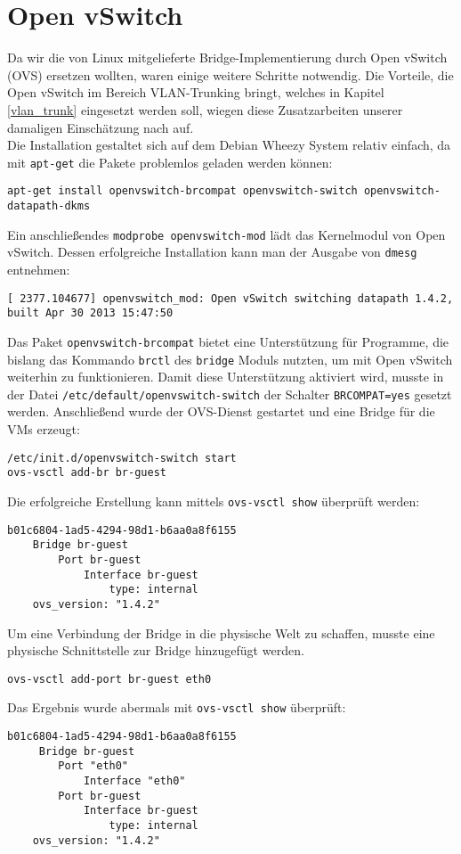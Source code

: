 \chapter{Open vSwitch}
\label{chap:ovs}
Da wir die von Linux mitgelieferte Bridge-Implementierung durch Open vSwitch (OVS) ersetzen wollten, waren einige weitere Schritte notwendig. Die Vorteile, die Open vSwitch im Bereich VLAN-Trunking bringt, welches in Kapitel \ref{vlan_trunk} eingesetzt werden soll, wiegen diese Zusatzarbeiten unserer damaligen Einschätzung nach auf.
\\
Die Installation gestaltet sich auf dem Debian Wheezy System relativ einfach, da mit \verb#apt-get# die Pakete problemlos geladen werden können:
\begin{verbatim}
apt-get install openvswitch-brcompat openvswitch-switch openvswitch-datapath-dkms
\end{verbatim}

Ein anschließendes \verb#modprobe openvswitch-mod# lädt das Kernelmodul von Open vSwitch. Dessen erfolgreiche Installation kann man der Ausgabe von \verb#dmesg# entnehmen:
\setupVerbatimOut
\begin{verbatim}
[ 2377.104677] openvswitch_mod: Open vSwitch switching datapath 1.4.2, built Apr 30 2013 15:47:50
\end{verbatim}
Das Paket \verb#openvswitch-brcompat# bietet eine Unterstützung für Programme, die bislang das Kommando \verb#brctl# des \verb#bridge# Moduls nutzten, um mit Open vSwitch weiterhin zu funktionieren. Damit diese Unterstützung aktiviert wird, musste in der Datei \verb#/etc/default/openvswitch-switch# der Schalter \verb#BRCOMPAT=yes# gesetzt werden. Anschließend wurde der OVS-Dienst gestartet und eine Bridge für die VMs erzeugt:
\setupVerbatimBash
\begin{verbatim}
/etc/init.d/openvswitch-switch start
ovs-vsctl add-br br-guest
\end{verbatim}
Die erfolgreiche Erstellung kann mittels \verb#ovs-vsctl show# überprüft werden:
\setupVerbatimOut
\begin{verbatim}
b01c6804-1ad5-4294-98d1-b6aa0a8f6155
    Bridge br-guest
        Port br-guest
            Interface br-guest
                type: internal
    ovs_version: "1.4.2"
\end{verbatim} 
Um eine Verbindung der Bridge in die physische Welt zu schaffen, musste eine physische Schnittstelle zur Bridge hinzugefügt werden.
\setupVerbatimBash
\begin{verbatim}
ovs-vsctl add-port br-guest eth0
\end{verbatim}
Das Ergebnis wurde abermals mit \verb#ovs-vsctl show# überprüft:
\setupVerbatimOut
\begin{verbatim}
b01c6804-1ad5-4294-98d1-b6aa0a8f6155
     Bridge br-guest
        Port "eth0"
            Interface "eth0"
        Port br-guest
            Interface br-guest
                type: internal
    ovs_version: "1.4.2"
\end{verbatim}

